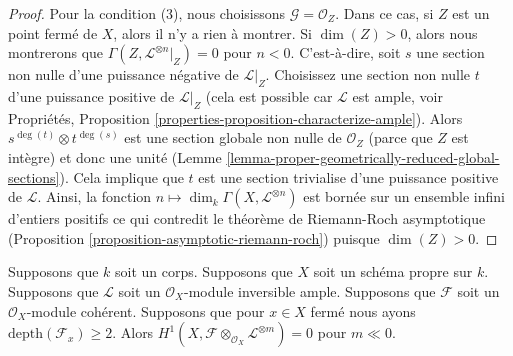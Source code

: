 \begin{proof}
\medskip\noindent
Pour la condition (3), nous choisissons $\mathcal{G} =
\mathcal{O}_Z$. Dans ce cas, si $Z$ est un point fermé de
$X$, alors il n'y a rien à montrer. Si $\dim(Z) > 0$,
alors nous montrerons que $\Gamma(Z, \mathcal{L}^{\otimes
n}|_Z) = 0$ pour $n < 0$. C'est-à-dire, soit $s$ une
section non nulle d'une puissance négative de
$\mathcal{L}|_Z$. Choisissez une section non nulle $t$ d'une
puissance positive de $\mathcal{L}|_Z$ (cela est possible
car $\mathcal{L}$ est ample, voir Propriétés, Proposition
\ref{properties-proposition-characterize-ample}). Alors
$s^{\deg(t)} \otimes t^{\deg(s)}$ est une section globale non
nulle de $\mathcal{O}_Z$ (parce que $Z$ est intègre) et donc
une unité (Lemme
\ref{lemma-proper-geometrically-reduced-global-sections}). Cela
implique que $t$ est une section trivialise d'une puissance positive
de $\mathcal{L}$. Ainsi, la fonction $n \mapsto \dim_k \Gamma(X,
\mathcal{L}^{\otimes n})$ est bornée sur un ensemble infini d'entiers
positifs ce qui contredit le théorème de Riemann-Roch asymptotique
(Proposition \ref{proposition-asymptotic-riemann-roch}) puisque $\dim(Z) > 0$.
\end{proof}

\begin{lemma}
\label{lemma-vanishin-h1-negative}
Supposons que $k$ soit un corps. Supposons que $X$ soit un
schéma propre sur $k$. Supposons que $\mathcal{L}$ soit un
$\mathcal{O}_X$-module inversible ample. Supposons que
$\mathcal{F}$ soit un $\mathcal{O}_X$-module cohérent.
Supposons que pour $x \in X$ fermé nous ayons
$\text{depth}(\mathcal{F}_x) \geq 2$. Alors $H^1(X, \mathcal{F}
\otimes_{\mathcal{O}_X} \mathcal{L}^{\otimes m}) = 0$ pour $m \ll 0$.
\end{lemma}

